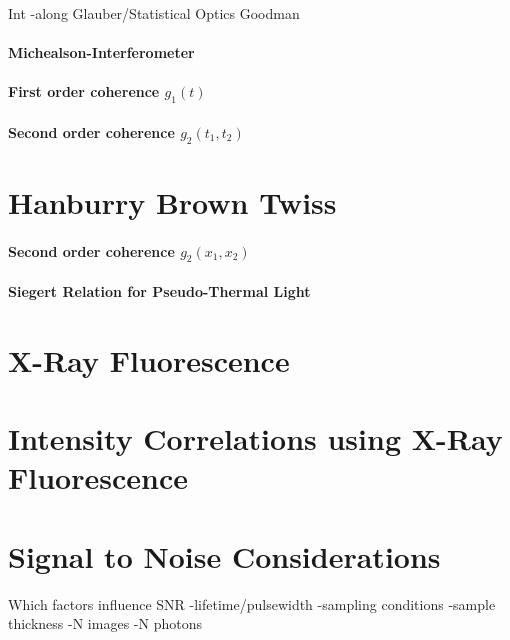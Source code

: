 Int
-along Glauber/Statistical Optics Goodman


\paragraph{Michealson-Interferometer}
\paragraph{First order coherence $g_1(t)$}
\paragraph{Second order coherence $g_2(t_1,t_2)$}


\section{Hanburry Brown Twiss}
\paragraph{Second order coherence $g_2(x_1,x_2)$}
\paragraph{Siegert Relation for Pseudo-Thermal Light}

\section{X-Ray Fluorescence}

\section{Intensity Correlations using X-Ray Fluorescence}
\section{Signal to Noise Considerations}
Which factors influence SNR
-lifetime/pulsewidth
-sampling conditions
-sample thickness
-N images
-N photons
\label{chap:theory}


